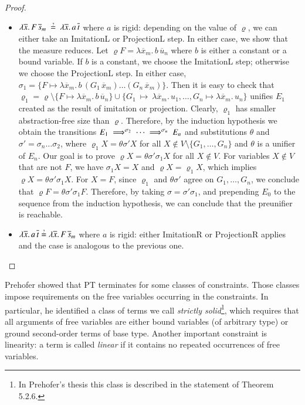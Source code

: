 \begin{proof}
\begin{itemize}
    \item $\lambda
    \overline{x}.\,F\,\overline{s}_m~\unif~\lambda \overline{x}.\,a \,
    \overline{t}$ where $a$ is rigid: depending on the value of $\varrho$, we can
    either take an \textsf{ImitationL} or \textsf{ProjectionL} step. In either case, we show that
    the measure reduces. Let $\varrho F = \lambda \overline{x}_m. \, b \, \overline{u}_n$ where $b$
    is either a constant or a bound variable. If $b$ is a constant, we choose
    the \textsf{ImitationL} step; otherwise we choose the \textsf{ProjectionL} step. In either case,
    $\sigma_1 = \{ F \mapsto \lambda \overline{x}_m. \, b \, (G_1 \, \overline{x}_m) \ldots
    (G_n \, \overline{x}_m) \}$. Then it is easy to check that $\varrho_1 = \varrho
    \setminus \{F \mapsto \lambda \overline{x}_m. \, b \, \overline{u}_n\} \cup \{ G_1~\mapsto~\lambda\overline{x}_m.\, u_1, \allowbreak
    \ldots, G_n \mapsto \lambda\overline{x}_m.\, u_n \}$ unifies $E_1$ created as the
    result of imitation or projection. Clearly, $\varrho_1$ has smaller abstraction-free size
    than $\varrho$. Therefore, by the induction hypothesis we obtain the transitions
    $E_1 \;\Longrightarrow^{\sigma_2}\; \cdots \;\Longrightarrow^{\sigma_n}\; E_n$ and substitutions
    $\theta$ and  $\sigma' = \sigma_n\ldots\sigma_2$, where $\varrho_1 X =
    \theta \sigma' X$ for all $X \not\in V\setminus\{G_1,\dots,G_n\}$ and $\theta$ is a unifier of $E_n$. Our goal is to prove
    $\varrho X = \theta \sigma' \sigma_1 X$ for all $X \not\in V$. 
    For variables $X \not\in V$ that are not $F$, we have $\sigma_1 X = X$
    and $\varrho X = \varrho_1 X$, which implies $\varrho X = \theta \sigma' \sigma_1 X$.
    For $X = F$, since $\varrho_1$ and $\theta \sigma'$ agree on $G_1, \ldots, G_n$, we
    conclude that $\varrho F = \theta \sigma' \sigma_1 F$.
    Therefore, by taking $\sigma = \sigma'\sigma_1$, and prepending $E_0$ to the
    sequence from the induction hypothesis, we can conclude that the preunifier is reachable.

    \item $\lambda \overline{x}.\,a \, \overline{t} \unif \lambda
    \overline{x}.\,F\,\overline{s}_m$ where $a$ is rigid:  either \textsf{ImitationR} or \textsf{ProjectionR} applies
    and the case is analogous to the previous one. \qedhere
  \end{itemize}
\end{proof}

Prehofer showed that PT terminates for some classes of constraints. Those
classes impose requirements on the free variables occurring in the constraints.
In particular, he identified a class of terms we call \emph{strictly
solid}\footnote{In Prehofer's thesis this class is described in the statement of
Theorem 5.2.6.}, which requires that all arguments of free variables are either
bound variables (of arbitrary type) or ground second-order terms of base type.
Another important constraint is linearity: a term is called
\emph{linear} if it contains no repeated occurrences of free variables.

